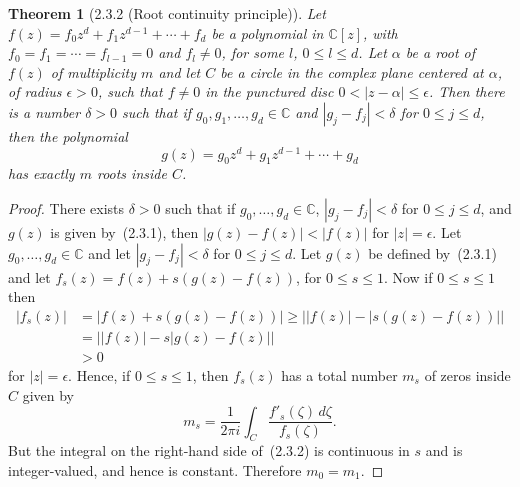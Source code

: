 \documentclass[11pt]{article}
\theoremstyle{plain}
\newtheorem*{theorem*}{Theorem}
\theoremstyle{definition}
\newcommand{\C}{\mathbb{C}}
\begin{document}
\begin{theorem*}[2.3.2 (Root continuity principle)]
Let $f(z) = f_0 z^d + f_1 z^{d-1} + \cdots + f_d$ be a polynomial in
$\C[z]$, with $f_0 = f_1 = \cdots = f_{l-1} = 0$ and $f_l \ne 0$, for
some $l$, $0 \le l \le d$. Let $\alpha$ be a root of $f(z)$ of
multiplicity $m$ and let $C$ be a circle in the complex plane centered
at $\alpha$, of radius $\epsilon > 0$, such that $f \ne 0$ in the
punctured disc $0 < |z - \alpha| \le \epsilon$. Then there is a number
$\delta > 0$ such that if $g_0, g_1, \ldots, g_d \in \C$ and
$|g_j - f_j| < \delta$ for $0 \le j \le d$, then the polynomial
\begin{equation}
g(z) = g_0 z^d + g_1 z^{d-1} + \cdots + g_d
\tag{2.3.1}
\end{equation}
has exactly $m$ roots inside $C$.
\end{theorem*}

\begin{proof}
There exists $\delta > 0$ such that if $g_0, \ldots, g_d \in \C$,
$|g_j - f_j| < \delta$ for $0 \le j \le d$, and $g(z)$ is given
by~(2.3.1), then $|g(z) - f(z)| < |f(z)|$ for $|z| = \epsilon$. Let
$g_0, \ldots, g_d \in \C$ and let $|g_j - f_j| < \delta$ for
$0 \le j \le d$. Let $g(z)$ be defined by~(2.3.1) and let
$f_s(z) = f(z) + s(g(z) - f(z))$, for $0 \le s \le 1$. Now if
$0 \le s \le 1$ then
\[
\begin{aligned}
|f_s(z)| &= |f(z) + s(g(z) - f(z))| \ge \bigl| |f(z)| - |s(g(z) - f(z))| \bigr| \\
&= \bigl| |f(z)| - s|g(z) - f(z)| \bigr| \\
&> 0
\end{aligned}
\]
for $|z| = \epsilon$. Hence, if $0 \le s \le 1$, then $f_s(z)$ has a
total number $m_s$ of zeros inside $C$ given by
\begin{equation}
m_s = \frac{1}{2\pi i} \int_C \frac{f'_s(\zeta) \, d\zeta}{f_s(\zeta)}.
\tag{2.3.2}
\end{equation}
But the integral on the right-hand side of~(2.3.2) is continuous in $s$
and is integer-valued, and hence is constant. Therefore $m_0 = m_1$.
\end{proof}
\end{document}
